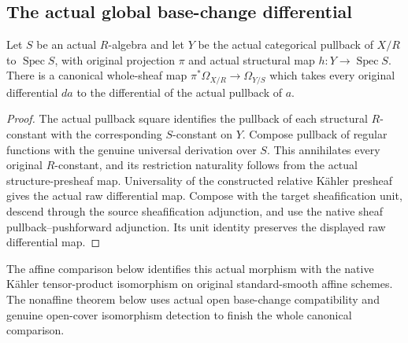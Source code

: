 \subsection{The actual global base-change differential}

\begin{lemma}
\label{lem:kn-arithmetic-global-basechange-map}
\leanok
Let $S$ be an actual $R$-algebra and let $Y$ be the actual categorical
pullback of $X/R$ to $\operatorname{Spec}S$, with original projection $\pi$
and actual structural map $h:Y\to\operatorname{Spec}S$.  There is a canonical
whole-sheaf map $\pi^*\Omega_{X/R}\to\Omega_{Y/S}$ which takes every original
differential $da$ to the differential of the actual pullback of $a$.
\end{lemma}
\begin{proof}
The actual pullback square identifies the pullback of each structural
$R$-constant with the corresponding $S$-constant on $Y$.  Compose pullback of
regular functions with the genuine universal derivation over $S$.  This
annihilates every original $R$-constant, and its restriction naturality follows
from the actual structure-presheaf map.  Universality of the constructed
relative K\"ahler presheaf gives the actual raw differential map.  Compose
with the target sheafification unit, descend through the source
sheafification adjunction, and use the native sheaf pullback--pushforward
adjunction.  Its unit identity preserves the displayed raw differential map.
\end{proof}

The affine comparison below identifies this actual morphism with the native
K\"ahler tensor-product isomorphism on original standard-smooth affine
schemes.  The nonaffine theorem below uses actual open base-change
compatibility and genuine open-cover isomorphism detection to finish the
whole canonical comparison.

